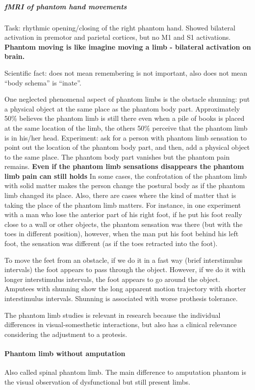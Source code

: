 \documentclass[12pt,article,oneside,a4paper]{memoir}
\begin{document}
\subparagraph{fMRI of phantom hand movements}
Task: rhythmic opening/closing of the right phantom hand. Showed bilateral
activation in premotor and parietal cortices, but no M1 and S1 activations.
\textbf{Phantom moving is like imagine moving a limb - bilateral activation on
brain.}
 
Scientific fact: does not mean remembering is not important, also does not mean
``body schema'' is ``inate''.

One neglected phenomenal aspect of phantom limbs is the obstacle shunning: put
a physical object at the same place as the phantom body part. Approximately 50\%
believes the phantom limb is still there even when a pile of books is placed at
the same location of the limb, the others 50\% perceive that the phantom limb is
in his/her head. Experiment: ask for a person with phantom limb sensation to
point out the location of the phantom body part, and then, add a physical object
to the same place. The phantom body part vanishes but the phantom pain remains.
\textbf{Even if the phantom limb sensations disappears the phantom limb pain
can still holds} In some cases, the confrotation of the phantom limb with solid
matter makes the person change the postural body as if the phantom limb changed
its place. Also, there are cases where the kind of matter that is taking the
place of the phantom limb matters. For instance, in one experiment with a man
who lose the anterior part of his right foot, if he put his foot really close
to a wall or other objects, the phantom sensation was there (but with the toes
in different position), however, when the man put his foot behind his left foot,
the sensation was different (as if the toes retracted into the foot).

To move the feet from an obstacle, if we do it in a fast way (brief interstimulus
intervals) the foot appears to pass through the object. However, if we do it with
longer interstimulus intervals, the foot appears to go around the object.
Amputees with shunning show the long apparent motion trajectory with shorter
interstimulus intervals. Shunning is associated with worse prothesis tolerance.

The phantom limb studies is relevant in research because the individual
differences in visual-somesthetic interactions, but also has a clinical
relevance considering the adjustment to a protesis.

\paragraph{Phantom limb without amputation}
Also called spinal phantom limb. The main difference to amputation phantom is
the visual observation of dysfunctional but still present limbs. 
\end{document}
